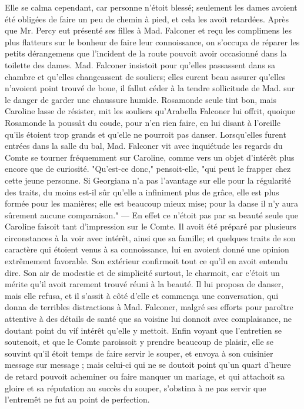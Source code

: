 Elle se calma cependant, car personne n'étoit blessé; seulement les dames avoient été obligées de faire un peu de chemin à pied, et cela les avoit retardées. Après que Mr. Percy eut présenté ses filles à Mad. Falconer et reçu les complimens les plus flatteurs sur le bonheur de faire leur connoissance, on s'occupa de réparer les petits dérangemens que l'incident de la route pouvoit avoir occasionné dans la toilette des dames. Mad. Falconer insistoit pour qu'elles passassent dans sa chambre et qu'elles changeassent de souliers; elles eurent beau assurer qu'elles n'avoient point trouvé de boue, il fallut céder à la tendre sollicitude de Mad. sur le danger de garder une chaussure humide. Rosamonde seule tint bon, mais Caroline lasse de résister, mit les souliers qu'Arabella Falconer lui offrit, quoique Rosamonde la poussât du coude, pour n'en rien faire, en lui disant à l'oreille qu'ils étoient trop grands et qu'elle ne pourroit pas danser.
Lorsqu'elles furent entrées dans la salle du bal, Mad. Falconer vit avec inquiétude les\setcounter{page}{134} regards du Comte se tourner fréquemment sur Caroline, comme vers un objet d'intérêt plus encore que de curiosité. "Qu'est-ce donc," pensoit-elle, "qui peut le frapper chez cette jeune personne. Si Georgiana n'a pas l'avantage sur elle pour la régularité des traits, du moins est-il sûr qu'elle a infiniment plus de grâce, elle est plus formée pour les manières; elle est beaucoup mieux mise; pour la danse il n'y aura sûrement aucune comparaison." — En effet ce n'étoit pas par sa beauté seule que Caroline faisoit tant d'impression sur le Comte. Il avoit été préparé par plusieurs circonstances à la voir avec intérêt, ainsi que sa famille; et quelques traits de son caractère qui étoient venus à sa connoissance, lui en avoient donné une opinion extrêmement favorable. Son extérieur confirmoit tout ce qu'il en avoit entendu dire. Son air de modestie et de simplicité surtout, le charmoit, car c'étoit un mérite qu'il avoit rarement trouvé réuni à la beauté. Il lui proposa de danser, mais elle refusa, et il s'assit à côté d'elle et commença une conversation, qui donna de terribles distractions à Mad. Falconer, malgré ses efforts pour paroître attentive à des détails de santé que sa\setcounter{page}{135} voisine lui donnoit avec complaisance, ne doutant point du vif intérêt qu'elle y mettoit. Enfin voyant que l'entretien se soutenoit, et que le Comte paroissoit y prendre beaucoup de plaisir, elle se souvint qu'il étoit temps de faire servir le souper, et envoya à son cuisinier message sur message ; mais celui-ci qui ne se doutoit point qu'un quart d'heure de retard pouvoit acheminer ou faire manquer un mariage, et qui attachoit sa gloire et sa réputation au succès du souper, s'obstina à ne pas servir que l'entremêt ne fut au point de perfection.
